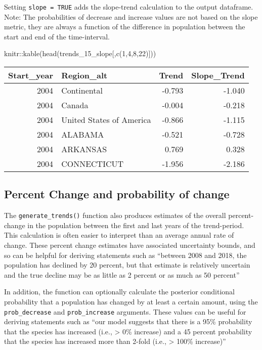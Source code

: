 \documentclass[
]{book}
\newenvironment{Shaded}{\begin{snugshade}}{\end{snugshade}}
\newcommand{\DecValTok}[1]{\textcolor[rgb]{0.00,0.00,0.81}{#1}}
\newcommand{\FunctionTok}[1]{\textcolor[rgb]{0.00,0.00,0.00}{#1}}
\newcommand{\NormalTok}[1]{#1}
\newcommand{\SpecialCharTok}[1]{\textcolor[rgb]{0.00,0.00,0.00}{#1}}
\begin{document}
Setting \texttt{slope\ =\ TRUE} adds the slope-trend calculation to the output dataframe. Note: The probabilities of decrease and increase values are not based on the slope metric, they are always a function of the difference in population between the start and end of the time-interval.

\begin{Shaded}
\begin{Highlighting}[]
\NormalTok{knitr}\SpecialCharTok{::}\FunctionTok{kable}\NormalTok{(}\FunctionTok{head}\NormalTok{(trends\_15\_slope[,}\FunctionTok{c}\NormalTok{(}\DecValTok{1}\NormalTok{,}\DecValTok{4}\NormalTok{,}\DecValTok{8}\NormalTok{,}\DecValTok{22}\NormalTok{)]))}
\end{Highlighting}
\end{Shaded}

\begin{tabular}{r|l|r|r}
\hline
Start\_year & Region\_alt & Trend & Slope\_Trend\\
\hline
2004 & Continental & -0.793 & -1.040\\
\hline
2004 & Canada & -0.004 & -0.218\\
\hline
2004 & United States of America & -0.866 & -1.115\\
\hline
2004 & ALABAMA & -0.521 & -0.728\\
\hline
2004 & ARKANSAS & 0.769 & 0.328\\
\hline
2004 & CONNECTICUT & -1.956 & -2.186\\
\hline
\end{tabular}

\hypertarget{percent-change-and-probability-of-change}{%
\subsection{Percent Change and probability of change}\label{percent-change-and-probability-of-change}}

The \texttt{generate\_trends()} function also produces estimates of the overall percent-change in the population between the first and last years of the trend-period. This calculation is often easier to interpret than an average annual rate of change. These percent change estimates have associated uncertainty bounds, and so can be helpful for deriving statements such as ``between 2008 and 2018, the population has declined by 20 percent, but that estimate is relatively uncertain and the true decline may be as little as 2 percent or as much as 50 percent''

In addition, the function can optionally calculate the posterior conditional probability that a population has changed by at least a certain amount, using the \texttt{prob\_decrease} and \texttt{prob\_increase} arguments. These values can be useful for deriving statements such as ``our model suggests that there is a 95\% probability that the species has increased (i.e., \textgreater{} 0\% increase) and a 45 percent probability that the species has increased more than 2-fold (i.e., \textgreater{} 100\% increase)''
\end{document}
